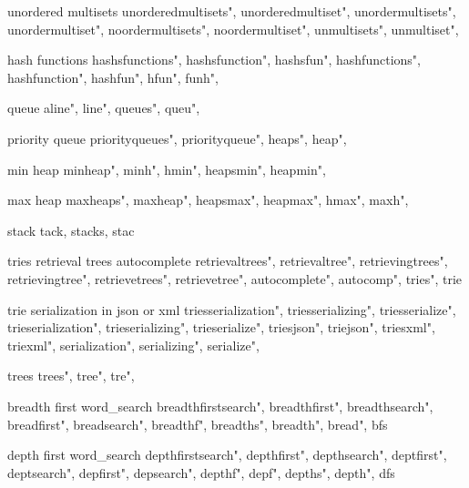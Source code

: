          unordered multisets
        unorderedmultisets", 
        unorderedmultiset", 
        unordermultisets", 
        unordermultiset", 
        noordermultisets", 
        noordermultiset", 
        unmultisets", 
        unmultiset", 
        
         hash functions
        hashsfunctions",  
        hashsfunction",  
        hashsfun",  
        hashfunctions",  
        hashfunction",  
        hashfun",  
        hfun",  
        funh",  
        
         queue 
        aline",
        line",
        queues",
        queu",
        
         priority queue 
        priorityqueues",  
        priorityqueue",  
        heaps",  
        heap",  
        
         min heap 
        minheap", 
        minh", 
        hmin",
        heapsmin",
        heapmin",
        
         max heap
        maxheaps",
        maxheap", 
        heapsmax",
        heapmax", 
        hmax",
        maxh",
        
         stack
        tack, stacks, stac
        
         tries retrieval trees autocomplete 
        retrievaltrees",  
        retrievaltree",  
        retrievingtrees",  
        retrievingtree",  
        retrievetrees",  
        retrievetree",  
        autocomplete",  
        autocomp",  
        tries",  
        trie
        
         trie serialization in json or xml 
        triesserialization",  
        triesserializing",  
        triesserialize",  
        trieserialization",  
        trieserializing",  
        trieserialize",  
        triesjson",  
        triejson",  
        triesxml",  
        triexml",  
        serialization",  
        serializing",  
        serialize",  
        
         trees 
        trees",
        tree",
        tre",
        
         breadth first word_search 
        breadthfirstsearch",  
        breadthfirst",  
        breadthsearch",  
        breadfirst",  
        breadsearch",  
        breadthf",  
        breadths",  
        breadth",  
        bread",  
        bfs
        
         depth first word_search 
        depthfirstsearch",  
        depthfirst",  
        depthsearch",  
        deptfirst",  
        deptsearch",  
        depfirst",  
        depsearch",  
        depthf",  
        depf",  
        depths",  
        depth",  
        dfs
        
